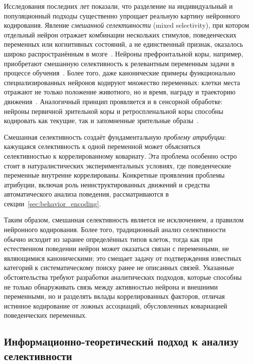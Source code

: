 Исследования последних лет показали, что разделение на индивидуальный и популяционный подходы существенно упрощает реальную картину нейронного кодирования. Явление \textit{смешанной селективности} (mixed selectivity), при котором отдельный нейрон отражает комбинации нескольких стимулов, поведенческих переменных или когнитивных состояний, а не единственный признак, оказалось широко распространённым в мозге~\cite{TyeMiller2024}. Нейроны префронтальной коры, например, приобретают смешанную селективность к релевантным переменным задачи в процессе обучения~\cite{mix3, Mante2013}. Более того, даже канонические примеры функционально специализированных нейронов кодируют множество переменных: клетки места отражают не только положение животного, но и время, награду и траекторию движения~\cite{Zheng2021, Lian2022}. Аналогичный принцип проявляется и в сенсорной обработке: нейроны первичной зрительной коры и ретроспленальной коры способны кодировать как текущие, так и запомненные зрительные образы~\cite{Makino2015}.

Смешанная селективность создаёт фундаментальную \textit{проблему атрибуции}: кажущаяся селективность к одной переменной может объясняться селективностью к коррелированному ковариату. Эта проблема особенно остро стоит в натуралистических экспериментальных условиях, где поведенческие переменные внутренне коррелированы. Конкретные проявления проблемы атрибуции, включая роль неинструктированных движений и средства автоматического анализа поведения, рассматриваются в секции~\ref{sec:behavior_encoding}.

Таким образом, смешанная селективность является не исключением, а правилом нейронного кодирования. Более того, традиционный анализ селективности обычно исходит из заранее определённых типов клеток, тогда как при естественном поведении нейрон может оказаться связан с переменными, не являющимися каноническими; это смещает задачу от подтверждения известных категорий к систематическому поиску ранее не описанных связей. Указанные обстоятельства требуют разработки аналитических подходов, которые способны не только обнаруживать связь между активностью нейрона и внешними переменными, но и разделять вклады коррелированных факторов, отличая истинное кодирование от ложных ассоциаций, обусловленных ковариацией поведенческих переменных.

\subsection{Информационно-теоретический подход к анализу селективности}
\label{sec:info_theoretic_selectivity}

